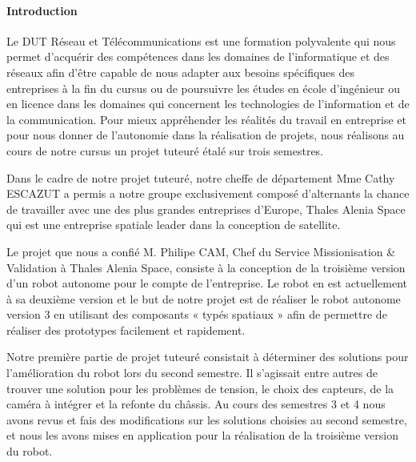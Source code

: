 \documentclass{PackagerQualityN}
\begin{document}

\newp       %
\setcounter{tocdepth}{2}
\tableofcontents
{}





\newp
{} %
\paragraph{Introduction}
Le DUT Réseau et Télécommunications est une formation polyvalente qui nous permet d’acquérir des compétences dans les domaines de l’informatique et des réseaux afin d’être capable de nous adapter aux besoins spécifiques des entreprises à la fin du cursus ou de poursuivre les études en école d’ingénieur ou en licence dans les domaines qui concernent les technologies de l’information et de la communication. 
Pour mieux appréhender les réalités du travail en entreprise et pour nous donner de l’autonomie dans la réalisation de projets, nous réalisons au cours de notre cursus un projet tuteuré étalé sur trois semestres.

Dans le cadre de notre projet tuteuré, notre cheffe de département Mme Cathy ESCAZUT a permis a notre groupe exclusivement composé d’alternants la chance de travailler avec une des plus grandes entreprises d’Europe, Thales Alenia Space qui est une entreprise spatiale leader dans la conception de satellite. 

Le projet que nous a confié M. Philipe CAM, Chef du Service Missionisation \& Validation à Thales Alenia Space, consiste à la conception de la troisième version d’un robot autonome pour le compte de l’entreprise. Le robot en est actuellement à sa deuxième version et le but de notre projet est de réaliser le robot autonome version 3 en utilisant des composants « typés spatiaux » afin de permettre de réaliser des prototypes facilement et rapidement.

Notre première partie de projet tuteuré consistait à déterminer des solutions pour l’amélioration du robot lors du second semestre. Il s’agissait entre autres de trouver une solution pour les problèmes de tension, le choix des capteurs, de la caméra à intégrer et la refonte du châssis. Au cours des semestres 3 et 4 nous avons revus et fais des modifications sur les solutions choisies au second semestre, et nous les avons mises en application pour la réalisation de la troisième version du robot.
\end{document}
